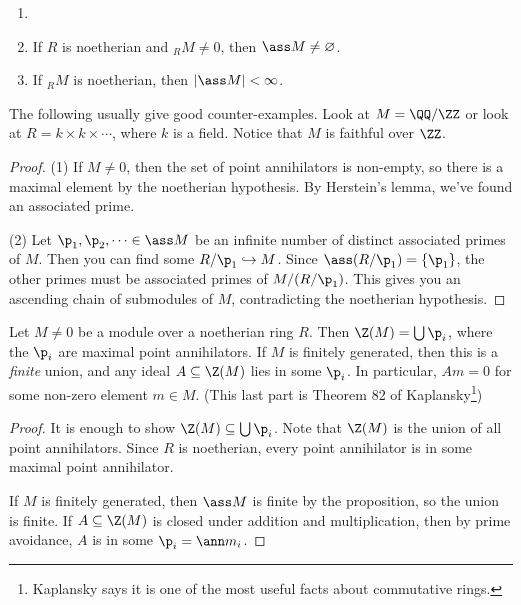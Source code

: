 
 \begin{proposition}
   \begin{enumerate}
     \item[]
     \item If $R$ is noetherian and ${}_R M\neq 0$, then $\ass M \neq \varnothing$.
     \item If ${}_R M$ is noetherian, then $|\ass M| < \infty$.
   \end{enumerate}
 \end{proposition}
 \begin{example}
   The following usually give good counter-examples. Look at $M=\QQ/\ZZ$ or look at
   $R=k\times k\times \cdots$, where $k$ is a field. Notice that $M$ is faithful over
   $\ZZ$.
 \end{example}
 \begin{proof}
   (1) If $M\neq 0$, then the set of point annihilators is non-empty, so there is a maximal
   element by the noetherian hypothesis. By Herstein's lemma, we've found an associated
   prime.

   (2) Let $\p_1,\p_2,\cdots \in \ass M$ be an infinite number of distinct associated
   primes of $M$. Then you can find some $R/\p_1\hookrightarrow M$. Since $\ass
   (R/\p_1)=\{\p_1\}$, the other primes must be associated primes of $M/(R/\p_1)$. This
   gives you an ascending chain of submodules of $M$, contradicting the noetherian
   hypothesis.
 \end{proof}
 \begin{theorem}[6.2]
   Let $M\neq 0$ be a module over a noetherian ring $R$. Then $\Z(M)=\bigcup \p_i$, where
   the $\p_i$ are maximal point annihilators. If $M$ is finitely generated, then this is
   a \emph{finite} union, and any ideal $A\subseteq \Z(M)$ lies in some $\p_i$. In
   particular, $Am=0$ for some non-zero element $m\in M$. (This last part is Theorem 82
   of Kaplansky\footnote{Kaplansky says it is one of the most useful facts about
   commutative rings.})
 \end{theorem}
 \begin{proof}
   It is enough to show $\Z(M)\subseteq \bigcup \p_i$. Note that $\Z(M)$ is the union of
   all point annihilators. Since $R$ is noetherian, every point annihilator is in some
   maximal point annihilator.

   If $M$ is finitely generated, then $\ass M$ is finite by the proposition, so the union
   is finite. If $A\subseteq \Z(M)$ is closed under addition and multiplication, then by
   prime avoidance, $A$ is in some $\p_i=\ann m_i$.
 \end{proof}
